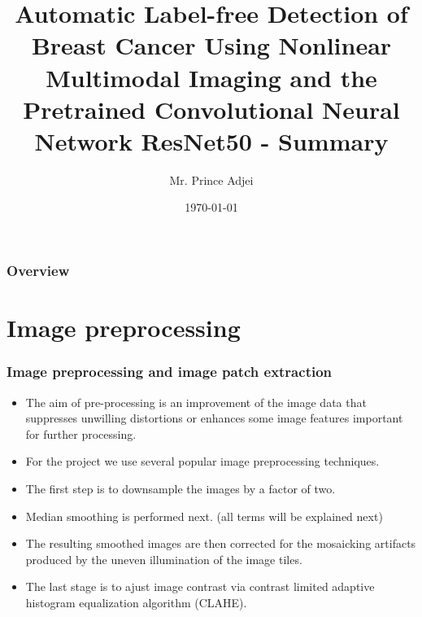 \documentclass{beamer}
\title[Paper summary]{Automatic Label-free Detection of Breast Cancer Using Nonlinear Multimodal Imaging and the Pretrained Convolutional Neural Network ResNet50 - Summary
} %
\author{Mr. Prince Adjei} %
\institute[Code Lab] %
{
Connected Devices Lab \\ %
\medskip
\textit{prince.e.adjei@gmail.com} %
}
\date{\today} %
\begin{document}
\begin{frame}
\titlepage %
\end{frame}

\begin{frame}
\frametitle{Overview} %
\tableofcontents %
\end{frame}


\section{Image preprocessing} %


\begin{frame}
\frametitle{Image preprocessing and image patch extraction }
\begin{itemize}
\item  The aim of pre-processing is an improvement of the image data that suppresses unwilling distortions or enhances some image features important for further processing.
\item For the project we use several popular image preprocessing techniques.
\item The first step is to downsample the images by a factor of two. 
\item Median smoothing is performed next. (all terms will be explained next)
\item  The resulting smoothed images are then corrected for the mosaicking artifacts produced by the uneven illumination of the image tiles.
\item The last stage is to ajust image contrast via contrast limited adaptive histogram equalization algorithm (CLAHE).
\end{itemize}
\end{frame}
\end{document}
